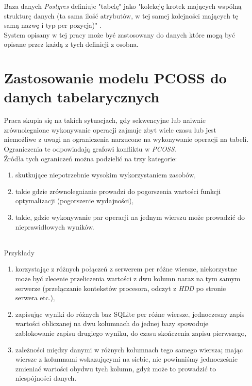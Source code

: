 \documentclass[brudnopis]{xmgr}
\begin{document}
Baza danych \emph{Postgres} definiuje "tabelę" jako "kolekcję krotek mających wspólną strukturę danych (ta sama ilość atrybutów, w tej samej kolejności mających tę samą nazwę i typ per pozycja)" \cite{PSQL:TAB}.
\medskip\\

System opisany w tej pracy może być zastosowany do danych które mogą być opisane przez każdą z tych definicji z osobna.

\chapter{Zastosowanie modelu PCOSS do danych tabelarycznych}

Praca skupia się na takich sytuacjach, gdy sekwencyjne lub naiwnie zrównolegnione wykonywanie operacji zajmuje zbyt wiele czasu lub jest niemożliwe z uwagi na ograniczenia narzucone na wykonywanie operacji na tabeli.
Ograniczenia te odpowiadają grafowi konfliktu w \emph{PCOSS}.
\medskip\\

Źródła tych ograniczeń można podzielić na trzy kategorie:
\begin{enumerate}
    \item skutkujące niepotrzebnie wysokim wykorzystaniem zasobów,
    \item takie gdzie zrównolegnianie prowadzi do pogorszenia wartości funkcji optymalizacji (pogorszenie wydajności),
    \item takie, gdzie wykonywanie par operacji na jednym wierszu może prowadzić do nieprawidłowych wyników.
\end{enumerate}
\medskip\\

Przykłady
\begin{enumerate}
    \item korzystając z różnych połączeń z serwerem per różne wiersze, niekorzystne może być zlecenie przeliczenia wartości z dwu kolumn naraz na tym samym serwerze (przełączanie kontekstów procesora, odczyt z \emph{HDD} po stronie serwera etc.),
    \item zapisując wyniki do różnych baz SQLite per różne wiersze, jednoczesny zapis wartości obliczanej na dwu kolumnach do jednej bazy spowoduje zablokowanie zapisu drugiego wyniku, do czasu skończenia zapisu pierwszego,
    \item zależności między danymi w różnych kolumnach tego samego wiersza; mając wiersze z kolumnami wskazującymi na siebie, nie powinniśmy jednocześnie zmieniać wartości obydwu tych kolumn, gdyż może to prowadzić to niespójności danych.
\end{enumerate}
\medskip\\
\end{document}
